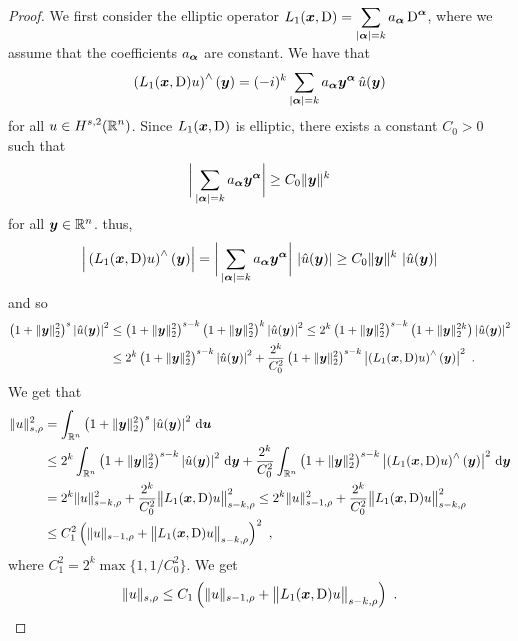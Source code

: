 \begin{proof}
 We first consider the elliptic operator
$\displaystyle L_1({\bm{x}},\operatorname{D}) = \sum_{|{\bm{\alpha}}|= k}
a_{{\bm{\alpha}}} \operatorname{D}^{{\bm{\alpha}}}$,
where we assume that the coefficients $a_{{\bm{\alpha}}}$ are constant.  We
have that
\[
 \left(L_1({\bm{x}},\operatorname{D}) u \right)^\wedge({\bm{y}})
= (-i)^k \sum_{|{\bm{\alpha}}|= k} a_{{\bm{\alpha}}} {\bm{y}}^{{\bm{\alpha}}} \,
\hat{u}({\bm{y}})
\]
for all $\displaystyle u \in H^{s,2}(\mathbb{R}^n)$.  Since
$L_1({\bm{x}},\operatorname{D})$ is elliptic, there exists a constant $C_0>0$ such that
\[
\bigg|\sum_{|{\bm{\alpha}}|= k} a_{{\bm{\alpha}}}
{\bm{y}}^{{\bm{\alpha}}}\bigg| \geq  C_0 \|{\bm{y}}\|^k
\]
for all ${\bm{y}} \in \mathbb{R}^n$.  thus,
\[
 \Big| \left(L_1({\bm{x}},\operatorname{D}) u \right)^\wedge({\bm{y}}) \Big|
= \bigg|\sum_{|{\bm{\alpha}}|= k} a_{{\bm{\alpha}}} {\bm{y}}^{{\bm{\alpha}}}\bigg| \,
\left|\hat{u}({\bm{y}})\right|
\geq C_0 \|{\bm{y}}\|^k \, \left|\hat{u}({\bm{y}})\right|
\]
and so
\begin{align*}
\left(1 + \|{\bm{y}}\|_2^2\right)^s \left| \hat{u}({\bm{y}})\right|^2
&\leq \left(1 + \|{\bm{y}}\|_2^2\right)^{s-k}
\left(1 + \|{\bm{y}}\|_2^2\right)^k \left| \hat{u}({\bm{y}})\right|^2
\leq 2^k \left(1 + \|{\bm{y}}\|_2^2\right)^{s-k}
\left(1 + \|{\bm{y}}\|_2^{2k}\right) \left| \hat{u}({\bm{y}})\right|^2 \\
&\leq 2^k \left(1 + \|{\bm{y}}\|_2^2\right)^{s-k}
\left| \hat{u}({\bm{y}})\right|^2
+ \frac{2^k}{C_0^2} \left(1 + \|{\bm{y}}\|_2^2\right)^{s-k}
\left| \left(L_1({\bm{x}},\operatorname{D}) u\right)^\wedge({\bm{y}})\right|^2 \ .
\end{align*}
We get that
\begin{align*}
\|u\|_{s,\rho}^2
&= \int_{\mathbb{R}^n}\left(1 + \|{\bm{y}}\|_2^2\right)^s
\left| \hat{u}({\bm{y}})\right|^2 \,\mathrm{d}{{\bm{u}}} \\
&\leq 2^k \int_{\mathbb{R}^n}
\left(1 + \|{\bm{y}}\|_2^2\right)^{s-k}
\left| \hat{u}({\bm{y}})\right|^2 \,\mathrm{d}{{\bm{y}}}
+ \frac{2^k}{C_0^2} \int_{\mathbb{R}^n} \left(1 + \|{\bm{y}}\|_2^2\right)^{s-k}
\left| \left(L_1({\bm{x}},\operatorname{D}) u\right)^\wedge({\bm{y}})\right|^2
\,\mathrm{d}{{\bm{y}}} \\
&= 2^k \|u\|_{s-k,\rho}^2
+ \frac{2^k}{C_0^2} \big\|L_1({\bm{x}},\operatorname{D})u\big\|_{s-k,\rho}^2
\leq 2^k \|u\|_{s-1,\rho}^2
+ \frac{2^k}{C_0^2} \big\|L_1({\bm{x}},\operatorname{D})u\big\|_{s-k,\rho}^2 \\
&\leq C_1^2 \left( \|u\|_{s-1,\rho} +
\big\|L_1({\bm{x}},\operatorname{D})u\big\|_{s-k,\rho}\right)^2 \ ,
\end{align*}
where $\displaystyle C_1^2 = 2^k \max\{1,1/C_0^2\}$.  We get
\begin{equation} \label{ellRegInEq1}
\|u\|_{s,\rho} \leq C_1 \left( \|u\|_{s-1,\rho} +
\big\|L_1({\bm{x}},\operatorname{D})u\big\|_{s-k,\rho}\right) \ .
\end{equation}


\end{proof}
